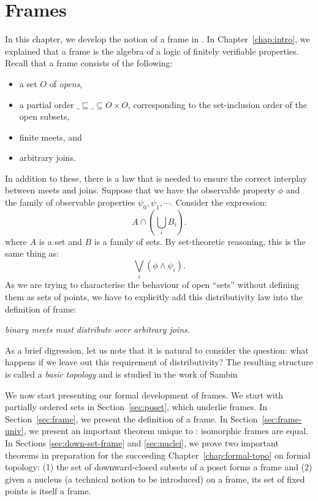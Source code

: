 \chapter{Frames}\label{chap:frames}

In this chapter, we develop the notion of a frame in \UF{}. In Chapter~\ref{chap:intro},
we explained that a frame is the algebra of a logic of finitely verifiable properties.
Recall that a frame consists of the following:
\begin{itemize}
  \item a set $O$ of \emph{opens},
  \item a partial order $\_\sqsubseteq\_ \subseteq O \times O$, corresponding to the set-inclusion order of the
    open subsets,
  \item finite meets, and
  \item arbitrary joins.
\end{itemize}

In addition to these, there is a law that is needed to ensure the correct interplay
between meets and joins. Suppose that we have the observable property $\phi$ and the family
of observable properties $\psi_0, \psi_1, \cdots$. Consider the expression:
\begin{equation*}
  A \cap (\bigcup_i B_i).
\end{equation*}
where $A$ is a set and $B$ is a family of sets. By set-theoretic reasoning, this is the
same thing as:
\begin{equation*}
  \bigvee_i (\phi \wedge \psi_i).
\end{equation*}
As we are trying to characterise the behaviour of open ``sets'' without defining them as
sets of points, we have to explicitly add this distributivity law into the definition of
frame:
\begin{center}
  \emph{binary meets must distribute over arbitrary joins.}
\end{center}

As a brief digression, let us note that it is natural to consider the question: what
happens if we leave out this requirement of distributivity? The resulting structure is
called a \emph{basic topology} and is studied in the work of Sambin

We now start presenting our formal development of frames. We start with partially ordered
sets in Section~\ref{sec:poset}, which underlie frames. In Section~\ref{sec:frame}, we
present the definition of a frame. In Section~\ref{sec:frame-univ}, we present an
important theorem unique to \UF{}: isomorphic frames are equal. In Sections
\ref{sec:down-set-frame} and \ref{sec:nuclei}, we prove two important theorems in
preparation for the succeeding Chapter~\ref{chap:formal-topo} on formal topology: (1) the
set of downward-closed subsets of a poset forms a frame and (2) given a nucleus (a
technical notion to be introduced) on a frame, its set of fixed points is itself a frame.

